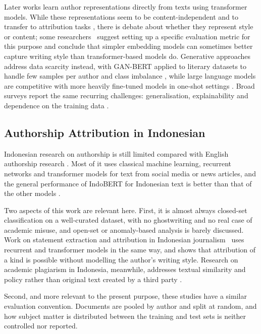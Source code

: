 \documentclass[runningheads]{llncs}
\begin{document}
Later works learn author representations directly from texts using transformer models. While these representations seem to be content-independent and to transfer to attribution tasks \cite{Wang2023}, there is debate about whether they represent style or content; some researchers~\cite{Terreau2021} suggest setting up a specific evaluation metric for this purpose and conclude that simpler embedding models can sometimes better capture writing style than transformer-based models do. Generative approaches address data scarcity instead, with GAN-BERT applied to literary datasets to handle few samples per author and class imbalance \cite{Silva2023}, while large language models are competitive with more heavily fine-tuned models in one-shot settings \cite{Hu2024}. Broad surveys report the same recurring challenges: generalisation, explainability and dependence on the training data \cite{Huang2024,Habib2025}.

\subsection{Authorship Attribution in Indonesian}

Indonesian research on authorship is still limited compared with English authorship research \cite{Saputra2023,Saputra2024,Muliono2023}. Most of it uses classical machine learning, recurrent networks and transformer models for text from social media or news articles, and the general performance of IndoBERT for Indonesian text is better than that of the other models \cite{Saputra2023,Saputra2024,Muliono2023,Putra2022,Shaw2025}.

Two aspects of this work are relevant here. First, it is almost always closed-set classification on a well-curated dataset, with no ghostwriting and no real case of academic misuse, and open-set or anomaly-based analysis is barely discussed. Work on statement extraction and attribution in Indonesian journalism~\cite{Yohanes2024} uses recurrent and transformer models in the same way, and shows that attribution of a kind is possible without modelling the author's writing style. Research on academic plagiarism in Indonesia, meanwhile, addresses textual similarity and policy rather than original text created by a third party \cite{Pratiwi2021}.

Second, and more relevant to the present purpose, these studies have a similar evaluation convention. Documents are pooled by author and split at random, and how subject matter is distributed between the training and test sets is neither controlled nor reported.
\end{document}
